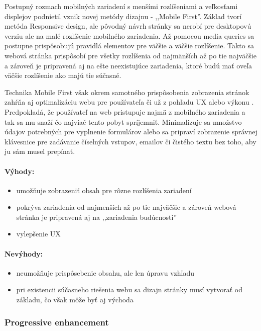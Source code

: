 Postupný rozmach mobilných zariadení s menšími rozlíšeniami a veľkosťami displejov podnietil vznik novej metódy dizajnu - ,,Mobile First''. Základ tvorí metóda Responsive design, ale pôvodný návrh stránky sa nerobí pre desktopovú verziu ale na malé rozlíšenie mobilného zariadenia. Až pomocou media queries sa postupne prispôsobujú pravidlá elementov pre väčšie a väčšie rozlíšenie. Takto sa webová stránka prispôsobí pre všetky rozlíšenia od najmänších až po tie najväčšie a zároveň je pripravená aj na ešte neexistujúce zariadenia, ktoré budú mať oveľa väčšie rozlíšenie ako majú tie súčasné.

Technika Mobile First však okrem samotného prispôsobenia zobrazenia stránok zahŕňa aj optimalizáciu webu pre používateľa či už z pohľadu UX alebo výkonu \cite{mobilefirst}. Predpokladá, že používateľ na web pristupuje najmä z mobilného zariadenia a tak sa mu snaží čo najviač tento pobyt spríjemniť. Minimalizuje sa množstvo údajov potrebných pre vyplnenie formulárov alebo sa pripraví zobrazenie správnej klávesnice pre zadávanie číselných vstupov, emailov či čistého textu bez toho, aby ju sám musel prepínať.

\paragraph{Výhody:}
\begin{itemize}
	\item umožňuje zobrazeniť obsah pre rôzne rozlíšenia zariadení
	\item pokrýva zariadenia od najmenších až po tie najväčšie a zároveň webová stránka je pripravená aj na ,,zariadenia budúcnosti''
  \item vylepšenie UX
\end{itemize}

\paragraph{Nevýhody:}
\begin{itemize}
	\item neumožňuje prispôsebenie obsahu, ale len úpravu vzhľadu
	\item pri existencii súčasneho riešenia webu sa dizajn stránky musí vytvorať od základu, čo však môže byť aj východa
\end{itemize}


\subsubsection{Progressive enhancement} %
\label{ssub:progressive_enhancement}


